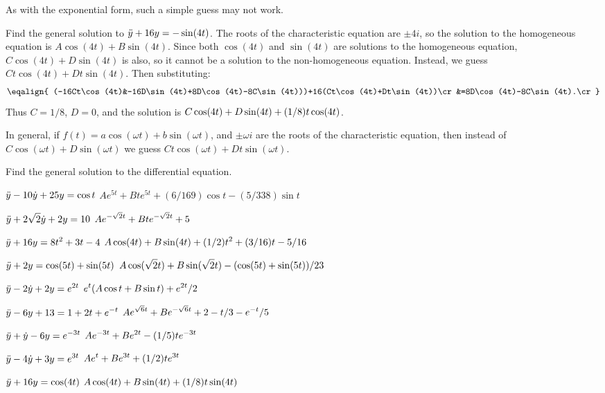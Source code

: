 As with the exponential form, such a simple guess may not work.

\example Find the general solution to $\displaystyle\ddot y+16y=-\sin(4t)$. 
The roots of the characteristic equation are $\pm4i$, so the
solution to the homogeneous equation is $A\cos(4t)+B\sin(4t)$. Since
both $\cos(4t)$ and $\sin(4t)$ are solutions to the homogeneous
equation,  $C\cos(4t)+D\sin(4t)$ is also, so it cannot be a solution
to the non-homogeneous equation. Instead, we guess
$Ct\cos(4t)+Dt\sin(4t)$. Then substituting:
$$\eqalign{
(-16Ct\cos(4t)&-16D\sin(4t)+8D\cos(4t)-8C\sin(4t)))+16(Ct\cos(4t)+Dt\sin(4t))\cr
&=8D\cos(4t)-8C\sin(4t).\cr}
$$
Thus $C=1/8$, $D=0$, and the solution is
$\displaystyle C\cos(4t)+D\sin(4t)+(1/8)t\cos(4t)$.
\endexample

In general, if $f(t)=a\cos(\omega t)+b\sin(\omega t)$, and $\pm \omega
i$ are the roots of the characteristic equation, then instead of 
$C\cos(\omega t)+D\sin(\omega t)$ we guess $Ct\cos(\omega t)+Dt\sin(\omega t)$.

\exercises

Find the general solution to the differential equation.

\exercise $\displaystyle\ddot y -10\dot y+25y=\cos t$
\answer $Ae^{5t}+Bte^{5t}+(6/169)\cos t-(5/338)\sin t$
\endanswer
\endexercise

\exercise $\displaystyle\ddot y+2\sqrt2\dot y+2y=10$
\answer $\displaystyle Ae^{-\sqrt2t}+Bte^{-\sqrt2t}+5$
\endanswer
\endexercise

\exercise $\displaystyle\ddot y+16y=8t^2+3t-4$
\answer $\displaystyle A\cos(4t)+B\sin(4t)+ (1/2)t^2+(3/16)t-5/16$
\endanswer
\endexercise

\exercise $\displaystyle\ddot y+2y=\cos(5t)+\sin(5t)$
\answer $\displaystyle A\cos(\sqrt2t)+B\sin(\sqrt2t)-(\cos(5t)+\sin(5t))/23$
\endanswer
\endexercise

\exercise $\displaystyle\ddot y-2\dot y+2y=e^{2t}$
\answer $\displaystyle e^{t}(A\cos t+B\sin t)+e^{2t}/2$
\endanswer
\endexercise

\exercise $\displaystyle\ddot y-6y+13=1+2t+e^{-t}$
\answer $\displaystyle Ae^{\sqrt6t}+Be^{-\sqrt6t}+2-t/3-e^{-t}/5$
\endanswer
\endexercise

\exercise $\displaystyle\ddot y+\dot y-6y=e^{-3t}$
\answer $\displaystyle Ae^{-3t}+Be^{2t}-(1/5)te^{-3t}$
\endanswer
\endexercise

\exercise $\displaystyle\ddot y-4\dot y+3y=e^{3t}$
\answer $\displaystyle Ae^t+Be^{3t}+(1/2)te^{3t}$
\endanswer
\endexercise

\exercise $\displaystyle\ddot y+16y=\cos(4t)$
\answer $\displaystyle A\cos(4t)+B\sin(4t)+(1/8)t\sin(4t)$
\endanswer
\endexercise


